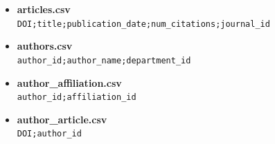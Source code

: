 \documentclass[
    12pt,
    a4paper,
    addpoints,
    answers,
    convocatoria=ext,
    titulacion=NoCD,
    curso=2023/2024,
]{db-exam}
\begin{document}
\begin{questions}
\begin{itemize}
    \item \textbf{articles.csv} \vspace{0.5em} \\
    \texttt{DOI;title;publication\_date;num\_citations;journal\_id\\
    }
    
    \item \textbf{authors.csv} \vspace{0.5em} \\
    \texttt{author\_id;author\_name;department\_id\\
    }

    \item \textbf{author\_affiliation.csv} \vspace{0.5em} \\
    \texttt{author\_id;affiliation\_id\\
    }

    \item \textbf{author\_article.csv} \vspace{0.5em} \\
    \texttt{DOI;author\_id\\
    }
    

\end{itemize}
\end{questions}
\end{document}
